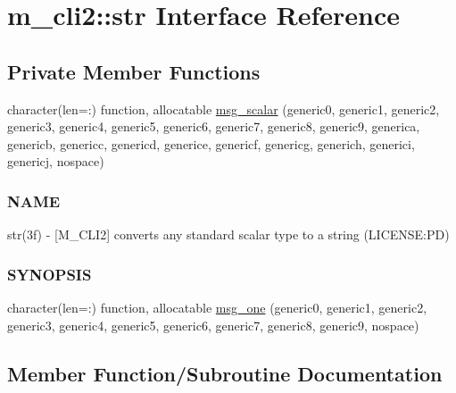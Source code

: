 \hypertarget{interfacem__cli2_1_1str}{}\section{m\+\_\+cli2\+:\+:str Interface Reference}
\label{interfacem__cli2_1_1str}
\subsection*{Private Member Functions}
\begin{DoxyCompactItemize}
\item 
character(len=\+:) function, allocatable \mbox{\hyperlink{interfacem__cli2_1_1str_a6981d9d92e581945d4528568b6457c29}{msg\+\_\+scalar}} (generic0, generic1, generic2, generic3, generic4, generic5, generic6, generic7, generic8, generic9, generica, genericb, genericc, genericd, generice, genericf, genericg, generich, generici, genericj, nospace)
\begin{DoxyCompactList}\small\item\em \subsubsection*{N\+A\+ME}

str(3f) -\/ \mbox{[}M\+\_\+\+C\+L\+I2\mbox{]} converts any standard scalar type to a string (L\+I\+C\+E\+N\+SE\+:PD) \subsubsection*{S\+Y\+N\+O\+P\+S\+IS}\end{DoxyCompactList}\item 
character(len=\+:) function, allocatable \mbox{\hyperlink{interfacem__cli2_1_1str_ac020bc195a094be93216e056337f1c12}{msg\+\_\+one}} (generic0, generic1, generic2, generic3, generic4, generic5, generic6, generic7, generic8, generic9, nospace)
\end{DoxyCompactItemize}


\subsection{Member Function/\+Subroutine Documentation}
\mbox{\label{interfacem__cli2_1_1str_ac020bc195a094be93216e056337f1c12}} 
